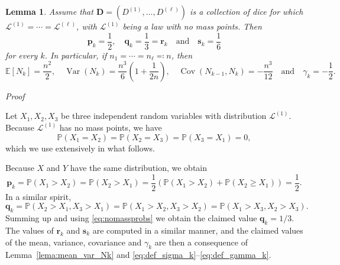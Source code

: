 \documentclass[reqno,a4paper,11pt]{amsart}
\makeatletter
\newcommand{\esp}[1]{\mathbb{E}\left[#1\right]}
\newtheorem{lemma}{Lemma}
\theoremstyle{remark}
\newcommand{\mc}[1]{{\mathcal #1}}
\newcommand{\mb}[1]{{\mathbf #1}}
\newcommand{\bb}[1]{{\mathbb #1}}
\numberwithin{equation}{section}
\newcommand{\var}[1]{\operatorname{Var}\left(#1\right)}
\newcommand{\cov}[1]{\operatorname{Cov}\left(#1\right)}
\renewenvironment{proof}[1][Proof]{\par
\pushQED{\qed}%
\normalfont \topsep6\p@\@plus6\p@\relax
\trivlist
\item\relax
{\itshape
#1\@addpunct{.}}\hspace\labelsep\ignorespaces
}{%
\popQED\endtrivlist\@endpefalse
}
\makeatother
\begin{document}
\begin{lemma}\label{lem:prqscontdistr}
    Assume that $\mb D=(D^{(1)},\hdots, D^{(\ell)})$ is a collection of dice for which $\mc L^{(1)}=\cdots = \mc L^{(\ell)}$, with $\mc L^{(1)}$ being a law with no mass points. Then
    $$
    \mb p_k=\frac{1}{2},\quad \mb q_k=\frac{1}{3}=\mb r_k \quad \text{and}\quad \mb s_k=\frac{1}{6}
    $$
    for every $k$. In particular, if $n_1=\cdots = n_\ell\eqqcolon n$, then
    $$
    \esp{N_k}=\frac{n^2}{2},\quad  \var{N_k}=\frac{n^3}{6}\left( 1+\frac{1}{2n} \right), \quad \cov{N_{k-1},N_k}=-\frac{n^3}{12} \quad \text{and}\quad \gamma_k=-\frac{1}{2}.
    $$
\end{lemma}
\begin{proof}
    Let $X_1,X_2,X_3$ be three independent random variables with distribution $\mc L^{(1)}$. Because $\mc L^{(1)}$ has no mass points, we have
    \begin{equation}\label{eq:nomassprobs}
    \bb P (X_1=X_2)=\bb P (X_2=X_3)=\bb P (X_3=X_1)=0,
    \end{equation}
    which we use extensively in what follows.
    
    Because $X$ and $Y$ have the same distribution, we obtain
    $$
    \mb p_k=\bb P(X_1>X_2)=\bb P(X_2>X_1)=\frac{1}{2}\left(\bb P(X_1>X_2)+\bb P(X_2\geq X_1)\right)=\frac{1}{2}.
    $$
    In a similar spirit, 
    $$
    \mb q_k=\bb P(X_2>X_1,X_3>X_1)=\bb P(X_1>X_2,X_3>X_2)=\bb P(X_1>X_3,X_2>X_3).
    $$
    Summing up and using \eqref{eq:nomassprobs} we obtain the claimed value $\mb q_k=1/3$. The values of $\mb r_k$ and $\mb s_k$ are computed in a similar manner, and the claimed values of the mean, variance, covariance and $\gamma_k$ are then a consequence of Lemma~\ref{lema:mean_var_Nk} and \eqref{eq:def_sigma_k}--\eqref{eq:def_gamma_k}.
\end{proof}
\end{document}
